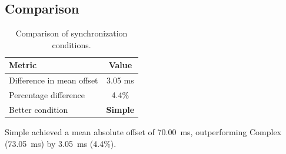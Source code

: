 \subsection*{Comparison}

\begin{table}[h!]
\centering
\begin{tabular}{|l|c|}
\hline
Metric & Value \\
\hline
Difference in mean offset & 3.05 ms \\
Percentage difference & 4.4\% \\
Better condition & \textbf{Simple} \\
\hline
\end{tabular}
\caption{Comparison of synchronization conditions.}
\label{tab:sync_comparison}
\end{table}

Simple achieved a mean absolute offset of 70.00~ms, outperforming Complex (73.05~ms) by 3.05~ms (4.4\%).

